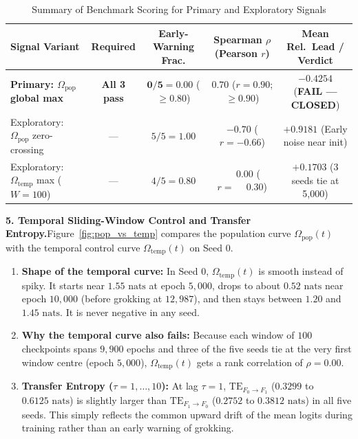 \documentclass[11pt,a4paper,oneside]{report}
\newcommand{\Fzero}{F_{0}}
\newcommand{\Fone}{F_{1}}
\newcommand{\Omegapop}{\Omega_{\mathrm{pop}}}
\newcommand{\Omegatemp}{\Omega_{\mathrm{temp}}}
\begin{document}
\begin{table}[htbp]
\centering
\caption{Summary of Benchmark Scoring for Primary and Exploratory Signals}
\label{tab:scoring_summary}
\vspace{4pt}
\small
\begin{tabularx}{0.96\textwidth}{>{\raggedright\arraybackslash}X c c c c}
\toprule
\textbf{Signal Variant} & \textbf{Required} & \textbf{Early-Warning Frac.} & \textbf{Spearman $\rho$ (Pearson $r$)} & \textbf{Mean Rel.\ Lead / Verdict}\\
\midrule
\textbf{Primary: $\Omegapop$ global max} & \textbf{All 3 pass} & $\mathbf{0/5 = 0.00}$ ($\ge 0.80$) & $\mathbf{0.70}$ ($r = 0.90$; $\ge 0.90$) & $\mathbf{-0.4254}$ (\textbf{FAIL --- CLOSED})\\
Exploratory: $\Omegapop$ zero-crossing & --- & $5/5 = 1.00$ & $-0.70$ ($r = -0.66$) & $+0.9181$ (Early noise near init)\\
Exploratory: $\Omegatemp$ max ($W=100$) & --- & $4/5 = 0.80$ & $\phantom{-}0.00$ ($r = \phantom{-}0.30$) & $+0.1703$ (3 seeds tie at 5,000)\\
\bottomrule
\end{tabularx}
\end{table}

\noindent\textbf{5. Temporal Sliding-Window Control and Transfer Entropy.}\quad Figure~\ref{fig:pop_vs_temp} compares the population curve $\Omegapop(t)$ with the temporal control curve $\Omegatemp(t)$ on Seed 0.
\begin{enumerate}[label=\textbf{(\roman*)}]
\item \textbf{Shape of the temporal curve:} In Seed 0, $\Omegatemp(t)$ is smooth instead of spiky. It starts near $1.55\text{ nats}$ at epoch $5{,}000$, drops to about $0.52\text{ nats}$ near epoch $10{,}000$ (before grokking at $12{,}987$), and then stays between $1.20$ and $1.45\text{ nats}$. It is never negative in any seed.
\item \textbf{Why the temporal curve also fails:} Because each window of $100$ checkpoints spans $9{,}900$ epochs and three of the five seeds tie at the very first window centre (epoch $5{,}000$), $\Omegatemp(t)$ gets a rank correlation of $\rho = 0.00$.
\item \textbf{Transfer Entropy ($\tau = 1, \ldots, 10$):} At lag $\tau = 1$, $\mathrm{TE}_{\Fzero \to \Fone}$ ($0.3299$ to $0.6125\text{ nats}$) is slightly larger than $\mathrm{TE}_{\Fone \to \Fzero}$ ($0.2752$ to $0.3812\text{ nats}$) in all five seeds. This simply reflects the common upward drift of the mean logits during training rather than an early warning of grokking.
\end{enumerate}
\end{document}

